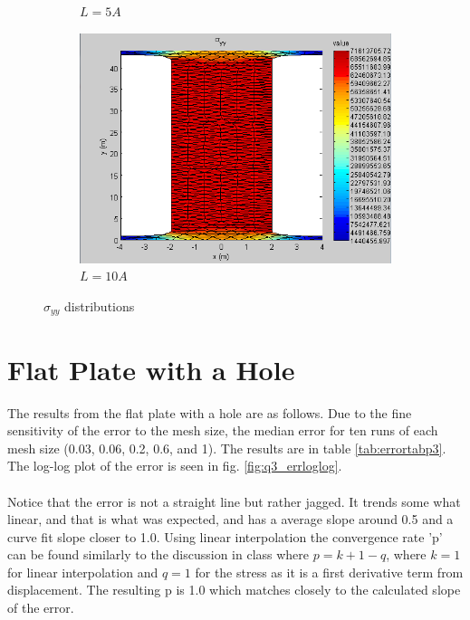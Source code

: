 \documentclass[paper=letter, fontsize=11pt]{scrartcl} %
\numberwithin{equation}{section} %
\numberwithin{figure}{section} %
\numberwithin{table}{section} %
\begin{document}
\begin{figure}[h]
\begin{subfigure}[b]{0.45\textwidth}
		\caption{$L = 5 A$}
	\end{subfigure}
	\hfill
	\begin{subfigure}[b]{0.45\textwidth}
		\includegraphics[width=\textwidth]{stress10.png}
		\caption{$L = 10 A$}
	\end{subfigure}
	\caption{$\sigma_{yy}$ distributions}
	\label{fig:stressdistp2}
\end{figure}



\pagebreak
\section{Flat Plate with a Hole}

The results from the flat plate with a hole are as follows. Due to the fine sensitivity of the error to the mesh size, the median error for ten runs of each mesh size (0.03, 0.06, 0.2, 0.6, and 1). The results are in table \ref{tab:errortabp3}. 
The log-log plot of the error is seen in fig. \ref{fig:q3_errloglog}.\\\\
Notice that the error is not a straight line but rather jagged. It trends some what linear, and that is what was expected, and has a average slope around 0.5 and a curve fit slope closer to 1.0. Using linear interpolation the convergence rate 'p' can be found similarly to the discussion in class where $p = k + 1 -q$, where $k=1$ for linear interpolation and $q=1$ for the stress as it is a first derivative term from displacement. The resulting p is 1.0 which matches closely to the calculated slope of the error. 
\end{document}
